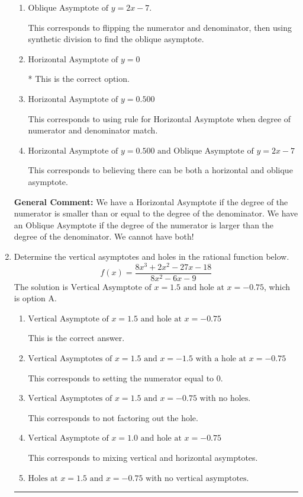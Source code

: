 \documentclass{extbook}[14pt]
\newcommand{\litem}[1]{\item #1

\rule{\textwidth}{0.4pt}}
\begin{document}
\begin{enumerate}
{\begin{enumerate}[label=\Alph*.]
This corresponds to considering where the denominator is equal to 0 as horizontal asymptote.
\item \( \text{Oblique Asymptote of } y = 2x -7. \)

This corresponds to flipping the numerator and denominator, then using synthetic division to find the oblique asymptote.
\item \( \text{Horizontal Asymptote of } y = 0 \)

* This is the correct option.
\item \( \text{Horizontal Asymptote of } y = 0.500  \)

This corresponds to using rule for Horizontal Asymptote when degree of numerator and denominator match.
\item \( \text{Horizontal Asymptote of } y = 0.500 \text{ and Oblique Asymptote of } y = 2x -7 \)

This corresponds to believing there can be both a horizontal and oblique asymptote.
\end{enumerate}

\textbf{General Comment:} We have a Horizontal Asymptote if the degree of the numerator is smaller than or equal to the degree of the denominator. We have an Oblique Asymptote if the degree of the numerator is larger than the degree of the denominator. We cannot have both!
}
\litem{
Determine the vertical asymptotes and holes in the rational function below.
\[ f(x) = \frac{8x^{3} +2 x^{2} -27 x -18}{8x^{2} -6 x -9} \]The solution is \( \text{Vertical Asymptote of } x = 1.5 \text{ and hole at } x = -0.75 \), which is option A.\begin{enumerate}[label=\Alph*.]
\item \( \text{Vertical Asymptote of } x = 1.5 \text{ and hole at } x = -0.75 \)

This is the correct answer.
\item \( \text{Vertical Asymptotes of } x = 1.5 \text{ and } x = -1.5 \text{ with a hole at } x = -0.75 \)

This corresponds to setting the numerator equal to 0.
\item \( \text{Vertical Asymptotes of } x = 1.5 \text{ and } x = -0.75 \text{ with no holes.} \)

This corresponds to not factoring out the hole.
\item \( \text{Vertical Asymptote of } x = 1.0 \text{ and hole at } x = -0.75 \)

This corresponds to mixing vertical and horizontal asymptotes.
\item \( \text{Holes at } x = 1.5 \text{ and } x = -0.75 \text{ with no vertical asymptotes.} \)


\end{enumerate}}
\end{enumerate}
\end{document}
